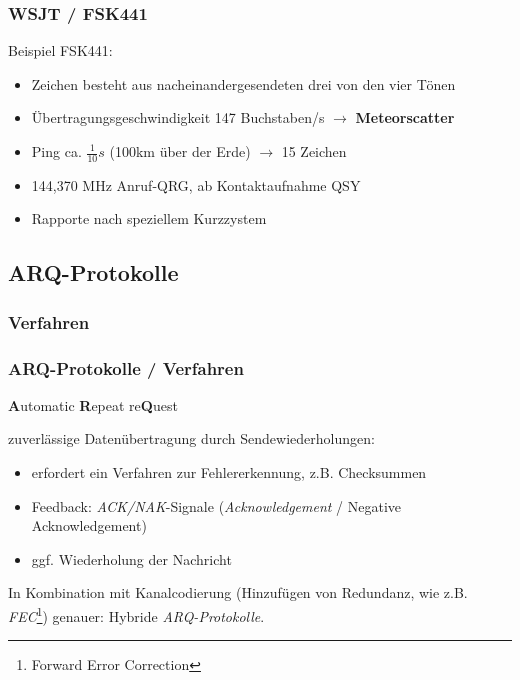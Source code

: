 \begin{frame}
    \frametitle{WSJT / FSK441}

    Beispiel FSK441:

    \begin{itemize}
        \item Zeichen besteht aus nacheinandergesendeten drei von den vier Tönen
        \item Übertragungsgeschwindigkeit 147 Buchstaben/s $\rightarrow$
              \textbf{Meteorscatter}
        \item Ping ca. $\frac{1}{10}s$ (100km über der Erde) $\rightarrow$ 15 Zeichen
        \item 144,370 MHz Anruf-QRG, ab Kontaktaufnahme QSY
        \item Rapporte nach speziellem Kurzzystem
    \end{itemize}

\end{frame}

\subsection{ARQ-Protokolle}

\subsubsection{Verfahren}

\begin{frame}
    \frametitle{ARQ-Protokolle / Verfahren}

    \textbf{A}utomatic \textbf{R}epeat re\textbf{Q}uest

    zuverlässige Datenübertragung durch Sendewiederholungen:

    \begin{itemize}
        \item erfordert ein Verfahren zur Fehlererkennung, z.B. Checksummen
        \item Feedback: \emph{ACK/NAK}-Signale (\emph{Acknowledgement} / {Negative Acknowledgement})
        \item ggf. Wiederholung der Nachricht
    \end{itemize}

    In Kombination mit Kanalcodierung (Hinzufügen von Redundanz, wie z.B.
    \emph{FEC}\footnote{Forward Error Correction}) genauer: Hybride \emph{ARQ-Protokolle}.

\end{frame}

